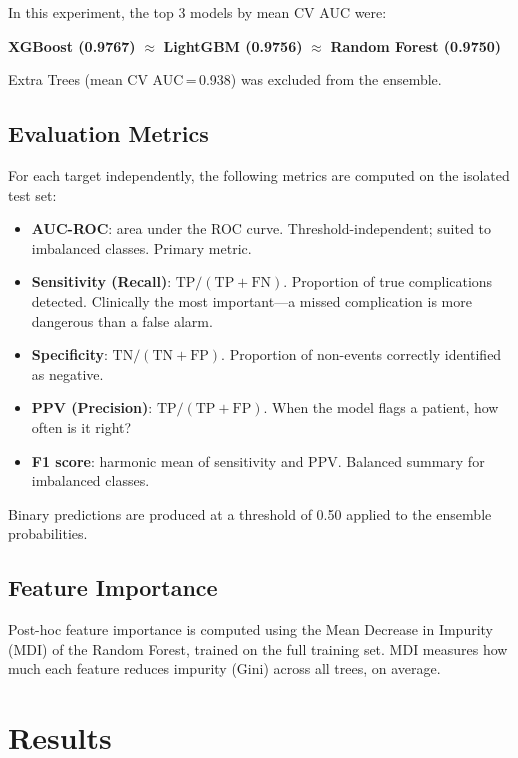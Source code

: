 \documentclass[12pt,a4paper]{report}
\begin{document}
In this experiment, the top 3 models by mean CV AUC were:
\begin{center}
\textbf{XGBoost (0.9767)} $\approx$ \textbf{LightGBM (0.9756)} $\approx$ \textbf{Random Forest (0.9750)}
\end{center}
Extra Trees (mean CV AUC\,=\,0.938) was excluded from the ensemble.

\section{Evaluation Metrics}

For each target independently, the following metrics are computed on the isolated test set:
\begin{itemize}
  \item \textbf{AUC-ROC}: area under the ROC curve. Threshold-independent; suited to imbalanced classes. Primary metric.
  \item \textbf{Sensitivity (Recall)}: $\text{TP} / (\text{TP} + \text{FN})$. Proportion of true complications detected. Clinically the most important---a missed complication is more dangerous than a false alarm.
  \item \textbf{Specificity}: $\text{TN} / (\text{TN} + \text{FP})$. Proportion of non-events correctly identified as negative.
  \item \textbf{PPV (Precision)}: $\text{TP} / (\text{TP} + \text{FP})$. When the model flags a patient, how often is it right?
  \item \textbf{F1 score}: harmonic mean of sensitivity and PPV. Balanced summary for imbalanced classes.
\end{itemize}
Binary predictions are produced at a threshold of 0.50 applied to the ensemble probabilities.

\section{Feature Importance}

Post-hoc feature importance is computed using the Mean Decrease in Impurity (MDI) of the Random Forest, trained on the full training set. MDI measures how much each feature reduces impurity (Gini) across all trees, on average.

\chapter{Results}
\label{chap:results}
\end{document}
